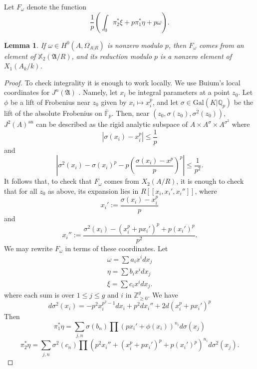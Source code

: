 \documentclass[11pt]{amsart}
\def\Z{\mathbb Z}
\def\Q{\mathbb Q}
\newcommand{\an}{\mathrm{an}}
\theoremstyle{plain}
\newtheorem{lemma}{Lemma}
\theoremstyle{definition}
\newcommand{\Gal}{\mathrm{Gal}}
\newcommand{\F}{\mathbb{F}}
\begin{document}
Let $F_{\omega }$ denote the function
\[
\frac{1}{p}(\int _0 \pi _2 ^* \xi +p\pi _1 ^* \eta +p\omega ).
\]
\begin{lemma}
If $\omega \in H^0 (A,\Omega _{A|R})$ is nonzero modulo $p$, then $F_\omega $ comes from an element of $\mathbb{X}_2 (\mathfrak{A}/R)$, and its reduction modulo $p$ is a nonzero element of $X_1 (A_k /k)$. 
\end{lemma}
\begin{proof}
To check integrality it is enough to work locally. We use Buium's local coordinates for $J^n (\mathfrak{A})$ \cite{buium:95}.  Namely, let $x_i $ be integral parameters at a point $z_0$. Let $\phi $ be a lift of Frobenius near $z_0 $ given by $x_i \mapsto x_i ^p$, and let $\sigma \in \Gal (K|\Q _p )$ be the lift of the absolute Frobenius on $\overline{\F }_p $. Then, near $(z_0 ,\sigma (z_0 ),\sigma ^2 (z_0 ))$, $J^2 (A)^{\an }$ can be described as the rigid analytic subspace of $A\times A^\sigma \times A^{\sigma ^2 }$ where 
\[
|\sigma (x_i ) -x_i ^p |\leq \frac{1}{p}
\]
and 
\[
|\sigma ^2 (x_i )-\sigma (x_i )^p-p(\frac{\sigma (x_i )-x^p }{p})^p|\leq \frac{1}{p^2 }.
\]
It follows that, to check that $F_\omega $ comes from $X_2 (A/R)$, it is enough to check that for all $z_0$ as above, its expansion lies in $R[\! [x_i ,x_i '  ,x_i '' ]\! ]$, where
\[
x_i ' :=\frac{\sigma (x_i ) -x_i ^p}{p}
\]
and 
\[
x_i '' := \frac{\sigma ^2 (x_i )-(x_i ^p +px_i ')^p +p(x_i ')^p }{p^2 }.
\]
We may rewrite $F_{\omega }$ in terms of these coordinates. Let 
\begin{align*}
\omega =\sum a_i x^i  dx_j  \\
\eta = \sum b_i x^i  dx_j  \\
\xi = \sum c_i x^i dx_j .
\end{align*}
where each sum is over $1\leq j\leq g$ and $i$ in $\Z _{\geq 0}^g$. We have
\[
d\sigma ^2 (x_i )=-p^2 x_i ^{p^2 -1}dx_i +p^2 dx_i '' +2d(x_i ^p +px_i ')^p
\]
Then 
\[
\pi _1 ^* \eta = \sum _{j,n} \sigma (b_n )\prod (px_i ' +\phi (x_i ))^{n_i } d\sigma (x_j )
\]
\[
\pi _2 ^* \eta = \sum _{j,n} \sigma ^2 (c_n ) \prod (p^2 x_i ''+(x_i ^p +px_i ')^p +p(x_i ')^p )^{n_i }d\sigma ^2 (x_j ).
\]%
\end{proof}
\end{document}
